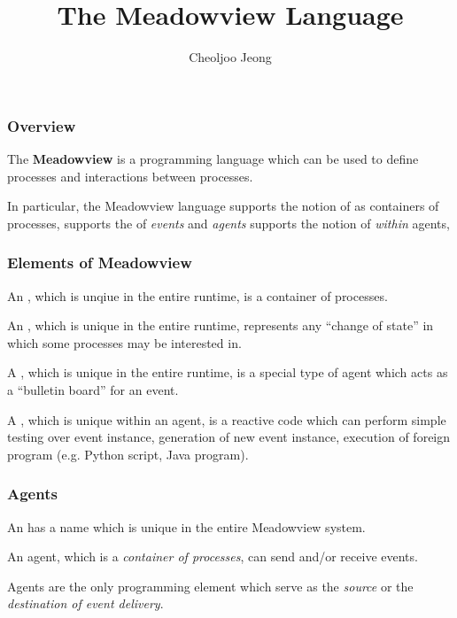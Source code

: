 \documentclass{beamer}
\title{The Meadowview Language}
\author{Cheoljoo Jeong}
\date{}
\begin{document}
\begin{frame}
\titlepage
\end{frame}


\begin{frame}
\frametitle{Overview}

The {\bf Meadowview} is a programming language which can be used to 
define processes and interactions between processes.

\vspace*{0.3cm}

In particular, the Meadowview language
\bit
\w supports the notion of  as containers of processes,
\w supports the  of {\em events\/} and {\em agents\/}
\w supports the notion of  {\em within\/} agents,
\eit

\end{frame}


\begin{frame}
\frametitle{Elements of Meadowview}

An , which is unqiue in the entire runtime,  is a container of
processes. 

\vspace*{0.3cm}

An , which is unique in the entire runtime, represents any
``change of state'' in which some processes may be interested in.

\vspace*{0.3cm}

A , which is unique in the entire runtime, is a special type of
agent which acts as a ``bulletin board'' for an event.

\vspace*{0.3cm}

A , which is unique within an agent, is a reactive code which can
perform simple testing over event instance, generation of new event instance, 
execution of foreign program (e.g. Python script, Java program). 

\end{frame}

\begin{frame}[fragile]
\frametitle{Agents}

An  has a name which is unique in the entire Meadowview
system. 

\vspace*{0.3cm}

An agent, which is a {\em container of processes\/}, can send and/or 
receive events.

\vspace*{0.3cm}

Agents are the only programming element which serve as the {\em source\/} or
the {\em destination of event delivery\/}.

\vspace*{0.3cm}
\end{frame}
\end{document}

